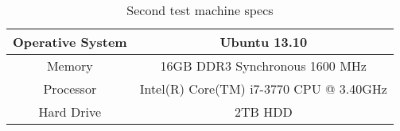 \begin{table}[H]
  \caption{Second test machine specs}
  \label{tab:acer_test}
  \begin{center}
    \begin{tabular}{|c|c|}
      \hline
      Operative System & Ubuntu 13.10\\
      \hline
      Memory           & 16GB DDR3 Synchronous 1600 MHz      \\
      \hline
      Processor        & Intel(R) Core(TM) i7-3770 CPU @ 3.40GHz \\
      \hline
      Hard Drive       & 2TB HDD  \\
      \hline
    \end{tabular}
  \end{center}
\end{table}
